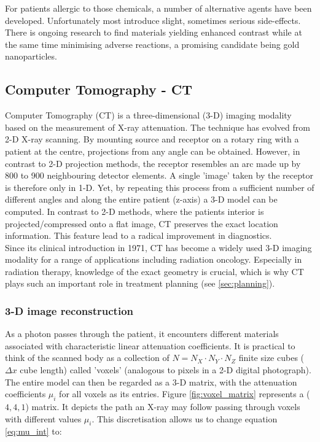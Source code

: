 For patients allergic to those chemicals, a number of alternative agents have been developed.
Unfortunately most introduce slight, sometimes serious side-effects.
There is ongoing research to find materials yielding enhanced contrast while at the same time minimising adverse reactions, a promising candidate being gold nanoparticles. \cite{Podgorsak, Maidment2014}


\subsection{Computer Tomography - CT}
Computer Tomography (CT) is a three-dimensional (3-D) imaging modality based on the measurement of X-ray attenuation.
The technique has evolved from 2-D X-ray scanning.
By mounting source and receptor on a rotary ring with a patient at the centre, projections from any angle can be obtained.
However, in contrast to 2-D projection methods, the receptor resembles an arc made up by 800 to 900 neighbouring detector elements.
A single 'image' taken by the receptor is therefore only in 1-D.
Yet, by repeating this process from a sufficient number of different angles and along the entire patient (z-axis) a 3-D model can be computed.
In contrast to 2-D methods, where the patients interior is projected/compressed onto a flat image, CT preserves the exact location information. This feature lead to a radical improvement in diagnostics.	 \\

Since its clinical introduction in 1971, CT has become a widely used 3-D imaging modality for a range of applications including radiation oncology. Especially in radiation therapy, knowledge of the exact geometry is crucial, which is why CT plays such an important role in treatment planning (see \ref{sec:planning}). \cite{Podgorsak, Maidment2014}

\subsubsection{3-D image reconstruction}
As a photon passes through the patient, it encounters different materials associated with characteristic linear attenuation coefficients.
It is practical to think of the scanned body as a collection of $N = N_X\cdot N_Y\cdot N_Z$ finite size cubes ($\Delta x$ cube length) called 'voxels' (analogous to pixels in a 2-D digital photograph).
The entire model can then be regarded as a 3-D matrix, with the attenuation coefficients $\mu_i$ for all voxels as its entries.
Figure \ref{fig:voxel_matrix} represents a ($4, 4, 1$) matrix.
It depicts the path an X-ray may follow passing through voxels with different values $\mu_i$.
This discretisation allows us to change equation \ref{eq:mu_int} to:

